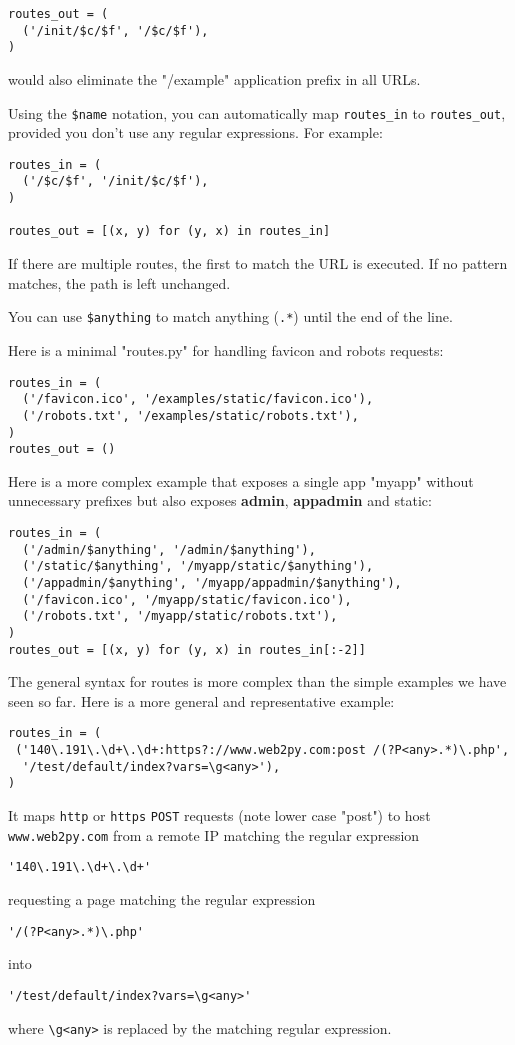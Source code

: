 \documentclass[justified,sixbynine,notoc]{tufte-book}
\def\ft{\small\tt}
\def\inxx#1{\index{#1}}
\begin{document}
\begin{fullwidth}
\begin{lstlisting}
routes_out = (
  ('/init/$c/$f', '/$c/$f'),
)
\end{lstlisting}
\noindent would also eliminate the "/example" application prefix in all URLs.

Using the {\ft \$name} notation, you can automatically map {\ft routes\_in} to {\ft routes\_out}, provided you don't use any regular expressions. For example:
\begin{lstlisting}
routes_in = (
  ('/$c/$f', '/init/$c/$f'),
)

routes_out = [(x, y) for (y, x) in routes_in]
\end{lstlisting}

If there are multiple routes, the first to match the URL is executed. If no pattern matches, the path is left unchanged.

You can use {\ft \$anything} to match anything ({\ft .*}) until the end of the line.

Here is a minimal "routes.py" for handling favicon and robots requests:

\inxx{favicon} \inxx{robots}
\begin{lstlisting}
routes_in = (
  ('/favicon.ico', '/examples/static/favicon.ico'),
  ('/robots.txt', '/examples/static/robots.txt'),
)
routes_out = ()
\end{lstlisting}

Here is a more complex example that exposes a single app "myapp" without unnecessary prefixes but also exposes {\bf admin}, {\bf appadmin} and static:

\begin{lstlisting}
routes_in = (
  ('/admin/$anything', '/admin/$anything'),
  ('/static/$anything', '/myapp/static/$anything'),
  ('/appadmin/$anything', '/myapp/appadmin/$anything'),
  ('/favicon.ico', '/myapp/static/favicon.ico'),
  ('/robots.txt', '/myapp/static/robots.txt'),
)
routes_out = [(x, y) for (y, x) in routes_in[:-2]]
\end{lstlisting}

The general syntax for routes is more complex than the simple examples we have seen so far. Here is a more general and representative example:
\begin{lstlisting}
routes_in = (
 ('140\.191\.\d+\.\d+:https?://www.web2py.com:post /(?P<any>.*)\.php',
  '/test/default/index?vars=\g<any>'),
)
\end{lstlisting}

It maps {\ft http} or {\ft https} {\ft POST} requests (note lower case "post") to host {\ft www.web2py.com} from a remote IP matching the regular expression
\begin{lstlisting}
'140\.191\.\d+\.\d+'
\end{lstlisting}
\noindent requesting a page matching the regular expression
\begin{lstlisting}
'/(?P<any>.*)\.php'
\end{lstlisting}
\noindent into
\begin{lstlisting}
'/test/default/index?vars=\g<any>'
\end{lstlisting}
\noindent where {\ft {\textbackslash}g<any>} is replaced by the matching regular expression.


\end{fullwidth}
\end{document}
